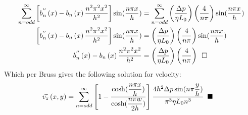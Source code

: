 \documentclass[titlepage]{article}
\begin{document}
    \begin{align}
        \sum_{n=odd}^{\infty}\left[b_{n}^{''}\left(x\right) - b_{n}\left(x\right)\displaystyle\frac{n^{2}\pi^{2}x^{2}}{h^2}\right]\sin(\displaystyle\frac{n\pi{x}}{h}) &= \sum_{n=odd}^{\infty}\left(\displaystyle\frac{\Delta{p}}{\eta{L_0}}\right)\left(\displaystyle\frac{4}{n\pi}\right)\sin(\displaystyle\frac{n\pi{x}}{h}) \\
        \left[b_{n}^{''}\left(x\right) - b_{n}\left(x\right)\displaystyle\frac{n^{2}\pi^{2}x^{2}}{h^2}\right]\sin(\displaystyle\frac{n\pi{x}}{h}) &= \left(\displaystyle\frac{\Delta{p}}{
        \eta{L_0}}\right)\left(\displaystyle\frac{4}{n\pi}\right)\sin(\displaystyle\frac{n\pi{x}}{h}) \\ 
        b_{n}^{''}\left(x\right) - b_{n}\left(x\right)\displaystyle\frac{n^{2}\pi^{2}x^{2}}{h^2} &= \left(\displaystyle\frac{\Delta{p}}{
        \eta{L_0}}\right)\left(\displaystyle\frac{4}{n\pi}\right) \hspace*{5pt}\square
    \end{align}
    Which per Bruss gives the following solution for velocity:
    \begin{align}
        \vec{v_{z}}\left(x,y\right)&=\sum_{n=odd}^{\infty}\left[1-\displaystyle\frac{\cosh(\displaystyle\frac{n\pi{x}}{h})}{\cosh(\displaystyle\frac{n\pi{w}}{2h})}\right]\displaystyle\frac{4h^2{\Delta{p}}\sin(n\pi\displaystyle\frac{y}{h})}{\pi^3{\eta}L_{0}n^3}\hspace*{5pt}\blacksquare
    \end{align}

\newpage
\end{document}
